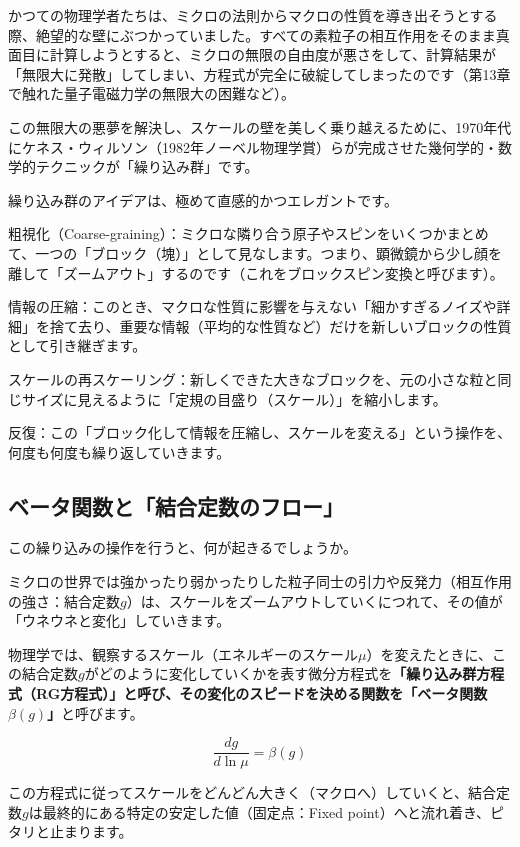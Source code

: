 かつての物理学者たちは、ミクロの法則からマクロの性質を導き出そうとする際、絶望的な壁にぶつかっていました。すべての素粒子の相互作用をそのまま真面目に計算しようとすると、ミクロの無限の自由度が悪さをして、計算結果が「無限大に発散」してしまい、方程式が完全に破綻してしまったのです（第13章で触れた量子電磁力学の無限大の困難など）。

この無限大の悪夢を解決し、スケールの壁を美しく乗り越えるために、1970年代にケネス・ウィルソン（1982年ノーベル物理学賞）らが完成させた幾何学的・数学的テクニックが「繰り込み群」です。

繰り込み群のアイデアは、極めて直感的かつエレガントです。

粗視化（Coarse-graining）：ミクロな隣り合う原子やスピンをいくつかまとめて、一つの「ブロック（塊）」として見なします。つまり、顕微鏡から少し顔を離して「ズームアウト」するのです（これをブロックスピン変換と呼びます）。

情報の圧縮：このとき、マクロな性質に影響を与えない「細かすぎるノイズや詳細」を捨て去り、重要な情報（平均的な性質など）だけを新しいブロックの性質として引き継ぎます。

スケールの再スケーリング：新しくできた大きなブロックを、元の小さな粒と同じサイズに見えるように「定規の目盛り（スケール）」を縮小します。

反復：この「ブロック化して情報を圧縮し、スケールを変える」という操作を、何度も何度も繰り返していきます。

\subsection{ベータ関数と「結合定数のフロー」}

この繰り込みの操作を行うと、何が起きるでしょうか。

ミクロの世界では強かったり弱かったりした粒子同士の引力や反発力（相互作用の強さ：結合定数\(g\)）は、スケールをズームアウトしていくにつれて、その値が「ウネウネと変化」していきます。

物理学では、観察するスケール（エネルギーのスケール\(\mu\)）を変えたときに、この結合定数\(g\)がどのように変化していくかを表す微分方程式を\textbf{「繰り込み群方程式（RG方程式）」と呼び、その変化のスピードを決める関数を「ベータ関数\(\beta(g)\)」}と呼びます。

\[\frac{dg}{d\ln \mu} = \beta(g)\]

この方程式に従ってスケールをどんどん大きく（マクロへ）していくと、結合定数\(g\)は最終的にある特定の安定した値（固定点：Fixed point）へと流れ着き、ピタリと止まります。

